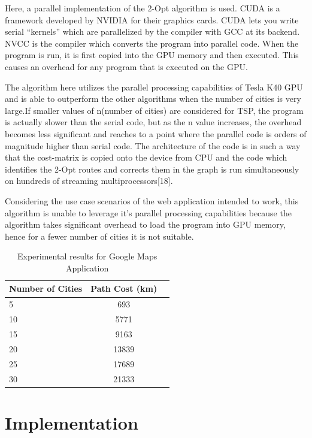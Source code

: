 \documentclass[conference]{IEEEtran}
\begin{document}
Here, a parallel implementation of the 2-Opt algorithm is used. CUDA is a framework developed by NVIDIA for their graphics cards. CUDA lets you write serial “kernels” which are parallelized by the compiler with GCC at its backend. NVCC is the compiler which converts the program into parallel code. When the program is run, it is first copied into the GPU memory and then executed. This causes an overhead for any program that is executed on the GPU. 

 The algorithm here utilizes the parallel processing capabilities of Tesla K40 GPU and is able to outperform the other algorithms when the number of cities is very large.If smaller values of n(number of cities) are considered for TSP, the program is actually slower than the serial code, but as the n value increases, the overhead becomes less significant and reaches to a point where the parallel code is orders of magnitude higher than serial code. The architecture of the code is in such a way that the cost-matrix is copied onto the device from CPU and the code which identifies the 2-Opt routes and corrects them in the graph is run simultaneously on hundreds of streaming multiprocessors[18]. 

 Considering the use case scenarios of the web application intended to work, this algorithm is unable to leverage it’s parallel processing capabilities because the algorithm takes significant overhead to load the program into GPU memory, hence for a fewer number of cities it is not suitable.

\begin{table}[h!]
  \begin{center}
    \label{tab:table4} \caption{Experimental results for Google Maps Application}
    \begin{tabular}{l|c|r}
      \textbf{Number of Cities} & \textbf{Path Cost (km)}\\
      \hline
      5 & 693\\
      10 & 5771\\
      15 & 9163\\
      20 & 13839\\ 
      25 & 17689\\
      30 & 21333\\
    \end{tabular}
    
  \end{center}
\end{table}


\section {Implementation}
\end{document}
